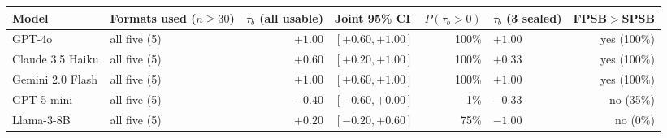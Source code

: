 \begin{tabular}{llrlrlr}
\toprule
Model & Formats used ($n\geq 30$) & $\tau_b$ (all usable) & Joint 95\% CI & $P(\tau_b>0)$ & $\tau_b$ (3 sealed) & FPSB$>$SPSB \\
\midrule
GPT-4o & all five (5) & $+1.00$ & $[+0.60, +1.00]$ & 100\% & $+1.00$ & yes (100\%) \\
Claude 3.5 Haiku & all five (5) & $+0.60$ & $[+0.20, +1.00]$ & 100\% & $+0.33$ & yes (100\%) \\
Gemini 2.0 Flash & all five (5) & $+1.00$ & $[+0.60, +1.00]$ & 100\% & $+1.00$ & yes (100\%) \\
GPT-5-mini & all five (5) & $-0.40$ & $[-0.60, +0.00]$ & 1\% & $-0.33$ & no (35\%) \\
Llama-3-8B & all five (5) & $+0.20$ & $[-0.20, +0.60]$ & 75\% & $-1.00$ & no (0\%) \\
\bottomrule
\end{tabular}
